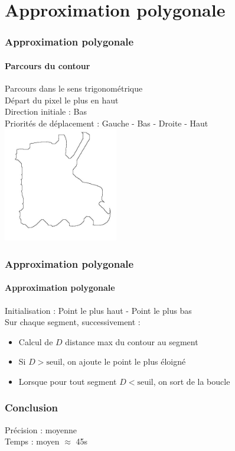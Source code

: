 \documentclass[french]{beamer}
\begin{document}
\section{Approximation polygonale}

\begin{frame}
	\frametitle{Approximation polygonale}
	\framesubtitle{Parcours du contour}
	Parcours dans le sens trigonométrique\\
	Départ du pixel le plus en haut\\
	Direction initiale : Bas \\
	Priorités de déplacement : Gauche - Bas - Droite - Haut\\
	\bigskip
	\includegraphics[width=5cm]{images/roller_contourn.jpg}
\end{frame}

\begin{frame}
	\frametitle{Approximation polygonale}
	\framesubtitle{Approximation polygonale}
	Initialisation : Point le plus haut - Point le plus bas\\
	Sur chaque segment, successivement :
	\begin{itemize}
		\item Calcul de $D$ distance max du contour au segment
		\item Si $D > \text{seuil}$, on ajoute le point le plus éloigné
		\item Lorsque pour tout segment $D < \text{seuil}$, on sort de la boucle
	\end{itemize}
\end{frame}

\begin{frame}
	\frametitle{Conclusion}
	\bigskip
	Précision : moyenne \\
	Temps : moyen $\approx$ 45s\\
\end{frame}
\end{document}
